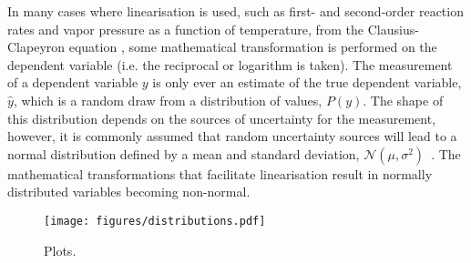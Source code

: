 \documentclass[reprint,superscriptaddress,nobibnotes,amsmath,amssymb]{revtex4-2}
\begin{document}
In many cases where linearisation is used, such as first- and second-order reaction rates and vapor pressure as a function of temperature, from the Clausius-Clapeyron equation \cite{perrin_linear_2017,harper_data_2017}, some mathematical transformation is performed on the dependent variable (i.e. the reciprocal or logarithm is taken). 
The measurement of a dependent variable $y$ is only ever an estimate of the true dependent variable, $\hat{y}$, which is a random draw from a distribution of values, $P(y)$. 
The shape of this distribution depends on the sources of uncertainty for the measurement, however, it is commonly assumed that random uncertainty sources will lead to a normal distribution defined by a mean and standard deviation, $\mathcal{N}(\mu, \sigma^2)$~\cite{monk_math_2010}.
The mathematical transformations that facilitate linearisation result in normally distributed variables becoming non-normal.
%
\begin{figure}
  \texttt{[image: figures/distributions.pdf]}
  \caption{
    Plots.
    }
  \label{fig:distributions}
\end{figure}
%





\end{document}
